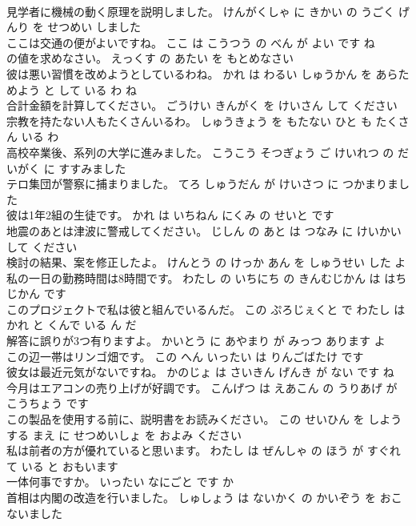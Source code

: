 \documentclass[8pt]{extreport}
\begin{document}
\begin{CJK}{UTF8}{min}
\\	見学者に機械の動く原理を説明しました。	けんがくしゃ に きかい の うごく げんり を せつめい しました 
\\	ここは交通の便がよいですね。	ここ は こうつう の べん が よい です ね 
\\	の値を求めなさい。	えっくす の あたい を もとめなさい 
\\	彼は悪い習慣を改めようとしているわね。	かれ は わるい しゅうかん を あらためよう と して いる わ ね 
\\	合計金額を計算してください。	ごうけい きんがく を けいさん して ください 
\\	宗教を持たない人もたくさんいるわ。	しゅうきょう を もたない ひと も たくさん いる わ 
\\	高校卒業後、系列の大学に進みました。	こうこう そつぎょう ご けいれつ の だいがく に すすみました 
\\	テロ集団が警察に捕まりました。	てろ しゅうだん が けいさつ に つかまりました 
\\	彼は1年2組の生徒です。	かれ は いちねん にくみ の せいと です 
\\	地震のあとは津波に警戒してください。	じしん の あと は つなみ に けいかい して ください 
\\	検討の結果、案を修正したよ。	けんとう の けっか あん を しゅうせい した よ 
\\	私の一日の勤務時間は8時間です。	わたし の いちにち の きんむじかん は はちじかん です 
\\	このプロジェクトで私は彼と組んでいるんだ。	この ぷろじぇくと で わたし は かれ と くんで いる ん だ 
\\	解答に誤りが3つ有りますよ。	かいとう に あやまり が みっつ あります よ 
\\	この辺一帯はリンゴ畑です。	この へん いったい は りんごばたけ です 
\\	彼女は最近元気がないですね。	かのじょ は さいきん げんき が ない です ね 
\\	今月はエアコンの売り上げが好調です。	こんげつ は えあこん の うりあげ が こうちょう です 
\\	この製品を使用する前に、説明書をお読みください。	この せいひん を しよう する まえ に せつめいしょ を およみ ください 
\\	私は前者の方が優れていると思います。	わたし は ぜんしゃ の ほう が すぐれて いる と おもいます 
\\	一体何事ですか。	いったい なにごと です か 
\\	首相は内閣の改造を行いました。	しゅしょう は ないかく の かいぞう を おこないました 

\end{CJK}
\end{document}
